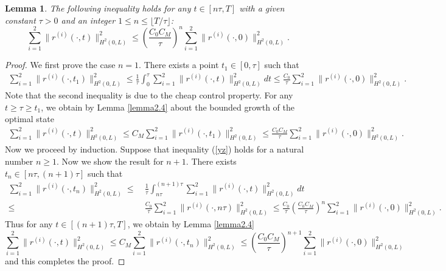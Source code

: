 \documentclass[12pt]{article}
\newtheorem{lemma}[theorem]{Lemma}
\numberwithin{equation}{section}
\begin{document}
\begin{lemma}\label{lemma13}
The following inequality holds for any $t \in [n\tau,T]$ with a given constant $\tau>0$ and an integer $1\leq n\leq \lfloor T/\tau\rfloor $:
\begin{equation}
\label{yz}
\sum_{i=1}^2 \|r^{(i)}(\cdot,t) \|_{H^2(0,L)}^2 \leq \left(\frac{C_0C_M}{\tau}\right)^n \sum_{i=1}^2 \|r^{(i)}(\cdot,0) \|_{H^2(0,L)}^2.
\end{equation}
\end{lemma}
\begin{proof}
    We first prove the case  $n=1$. There exists a point $t_1\in[0,\tau]$ such that
    \begin{align*}
    \sum_{i=1}^2 \|r^{(i)}(\cdot,t_1) \|_{H^2(0,L)}^2 \leq \frac{1}{\tau} \int_{0}^{\tau}
    \sum_{i=1}^2 \|r^{(i)}(\cdot,t) \|_{H^2(0,L)}^2 dt
    \leq \frac{C_0}{\tau} \sum_{i=1}^2 \|r^{(i)}(\cdot,0) \|_{H^2(0,L)}^2.
    \end{align*}
    Note that the second inequality is due to the cheap control property.
For any $t\geq \tau \geq t_1$, we obtain by Lemma \ref{lemma2.4} about the bounded growth of the optimal state 
    \begin{align*}
    \sum_{i=1}^2 \|r^{(i)}(\cdot,t) \|_{H^2(0,L)}^2
    \leq C_M\sum_{i=1}^2 \|r^{(i)}(\cdot,t_1) \|_{H^2(0,L)}^2
    \leq \frac{C_0C_M}{\tau} \sum_{i=1}^2 \|r^{(i)}(\cdot,0) \|_{H^2(0,L)}^2.
    \end{align*}
    Now we proceed by induction.
    Suppose that   inequality  (\ref{yz}) holds for a natural number $n\geq 1$.
    Now we  show  the result for $n+1$. There exists $t_n\in[n\tau,(n+1)\tau]$ such that
\begin{align*}
    \sum_{i=1}^2 \|r^{(i)}(\cdot,t_n) \|_{H^2(0,L)}^2 \leq&~ \frac{1}{\tau} \int_{n\tau}^{(n+1)\tau}\sum_{i=1}^2 \|r^{(i)}(\cdot,t) \|_{H^2(0,L)}^2dt\\[2mm] 
    \leq&~\frac{C_0}{\tau} \sum_{i=1}^2 \|r^{(i)}(\cdot,n\tau) \|_{H^2(0,L)}^2 \leq \frac{C_0}{\tau} \left(\frac{C_0C_M}{\tau}\right)^n \sum_{i=1}^2 \|r^{(i)}(\cdot,0) \|_{H^2(0,L)}^2.
    \end{align*}
Thus for any $t\in[(n+1)\tau,T]$, we obtain by Lemma \ref{lemma2.4}
$$
\sum_{i=1}^2 \|r^{(i)}(\cdot,t) \|_{H^2(0,L)}^2 \leq C_M\sum_{i=1}^2 \|r^{(i)}(\cdot,t_n) \|_{H^2(0,L)}^2\leq \left(\frac{C_0C_M}{\tau}\right)^{n+1} \sum_{i=1}^2 \|r^{(i)}(\cdot,0) \|_{H^2(0,L)}^2
$$ 
and this completes the proof.
\end{proof}
\end{document}
